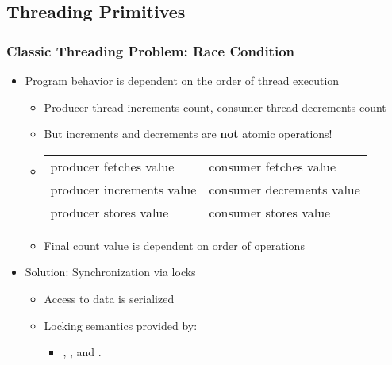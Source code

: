 %
%
%

\subsection{Threading Primitives}



\begin{slide}
\frametitle{Classic Threading Problem: Race Condition}

\begin{itemize}
\item Program behavior is dependent on the order of thread execution
  \begin{itemize}
  \item Producer thread increments count, consumer thread decrements count
  \item But increments and decrements are \textbf{not} atomic operations!
    \item [] \vspace{0.5em}
    \begin{tabular}{l|l}
    \footnotesize{producer fetches value} & \footnotesize{consumer fetches value} \\
    \footnotesize{producer increments value} & \footnotesize{consumer decrements value} \\
    \footnotesize{producer stores value} & \footnotesize{consumer stores value} \\
    \end{tabular}
  \item \vspace{0.5em} Final count value is dependent on order of operations
  \end{itemize}

\vspace{1em}
\item Solution: Synchronization via locks
  \begin{itemize}
  \item Access to data is serialized
  \item Locking semantics provided by:
  \begin{itemize}
  \item {}, , and .
  \end{itemize}
  \end{itemize}
\end{itemize}

\end{slide}

